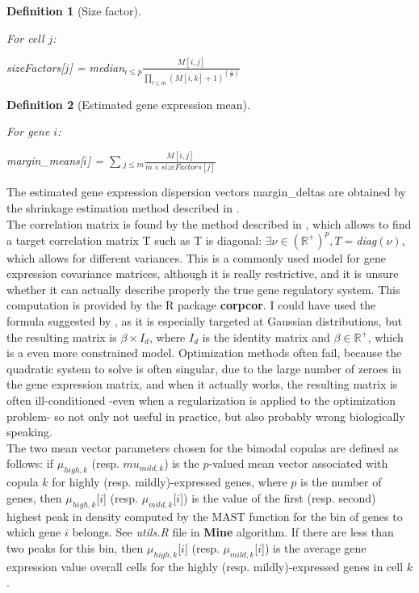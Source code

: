 \documentclass{report}
\newtheorem{definition}{Definition}[section]
\begin{document}
{\begin{definition}[Size factor]\label{sizefactor}{For cell $j$:\begin{center}sizeFactors[$j$] = \textit{median}$_{i \leq p} \frac{M[i, j]}{\prod_{l \leq m} (M[i, k]+1)^{(\frac{1}{m})}}$\end{center}}\end{definition}

\begin{definition}[Estimated gene expression mean]\label{marginmean}{For gene $i$:\begin{center}margin\_means[$i$] = $\sum{_{j \leq m} \frac{M[i, j]}{m \times sizeFactors[j]}}$\end{center}}\end{definition}

The estimated gene expression dispersion vectors margin\_deltas are obtained by the shrinkage estimation method described in \cite{yu2013shrinkage}.\\

The correlation matrix is found by the method described in \cite{schafer2005shrinkage}, which allows to find a target correlation matrix T such as T is diagonal: $\exists \nu \in (\mathbb{R}^{+})^{p}, T = $\textit{diag}$(\nu)$, which allows for different variances. This is a commonly used model for gene expression covariance matrices, although it is really restrictive, and it is unsure whether it can actually describe properly the true gene regulatory system. This computation is provided by the R package \textbf{corpcor}. I could have used the formula suggested by \cite{chen2009shrinkage}, as it is especially targeted at Gaussian distributions, but the resulting matrix is $\beta \times I_d$, where $I_d$ is the identity matrix and $\beta \in \mathbb{R}^{+}$, which is a even more constrained model. Optimization methods often fail, because the quadratic system to solve is often singular, due to the large number of zeroes in the gene expression matrix, and when it actually works, the resulting matrix is often ill-conditioned -even when a regularization is applied to the optimization problem- so not only not useful in practice, but also probably wrong biologically speaking.\\

The two mean vector parameters chosen for the bimodal copulas are defined as follows: if $\mu_{high, k}$ (resp. $mu_{mild, k}$) is the $p$-valued mean vector associated with copula $k$ for highly (resp. mildly)-expressed genes, where $p$ is the number of genes, then $\mu_{high, k}$[$i$] (resp. $\mu_{mild, k}$[$i$]) is the value of the first (resp. second) highest peak in density computed by the MAST function for the bin of genes to which gene $i$ belongs. See \emph{utils.R} file in \textbf{Mine} algorithm. If there are less than two peaks for this bin, then $\mu_{high, k}$[$i$] (resp. $\mu_{mild, k}$[$i$]) is the average gene expression value overall cells for the highly (resp. mildly)-expressed genes in cell $k$.\\

}
\end{document}
